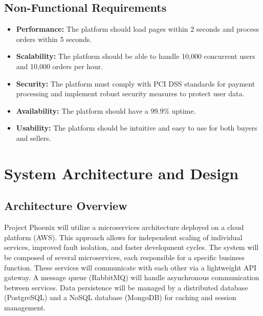\documentclass[11pt,a4paper,oneside]{article}
\begin{document}
\subsection{Non-Functional Requirements}

\begin{itemize}
    \item \textbf{Performance:} The platform should load pages within 2 seconds and process orders within 5 seconds.
    \item \textbf{Scalability:} The platform should be able to handle 10,000 concurrent users and 10,000 orders per hour.
    \item \textbf{Security:} The platform must comply with PCI DSS standards for payment processing and implement robust security measures to protect user data.
    \item \textbf{Availability:} The platform should have a 99.9\% uptime.
    \item \textbf{Usability:} The platform should be intuitive and easy to use for both buyers and sellers.
\end{itemize}

\section{System Architecture and Design}

\subsection{Architecture Overview}

Project Phoenix will utilize a microservices architecture deployed on a cloud platform (AWS).  This approach allows for independent scaling of individual services, improved fault isolation, and faster development cycles.  The system will be composed of several microservices, each responsible for a specific business function.  These services will communicate with each other via a lightweight API gateway.  A message queue (RabbitMQ) will handle asynchronous communication between services.  Data persistence will be managed by a distributed database (PostgreSQL) and a NoSQL database (MongoDB) for caching and session management.
\end{document}
